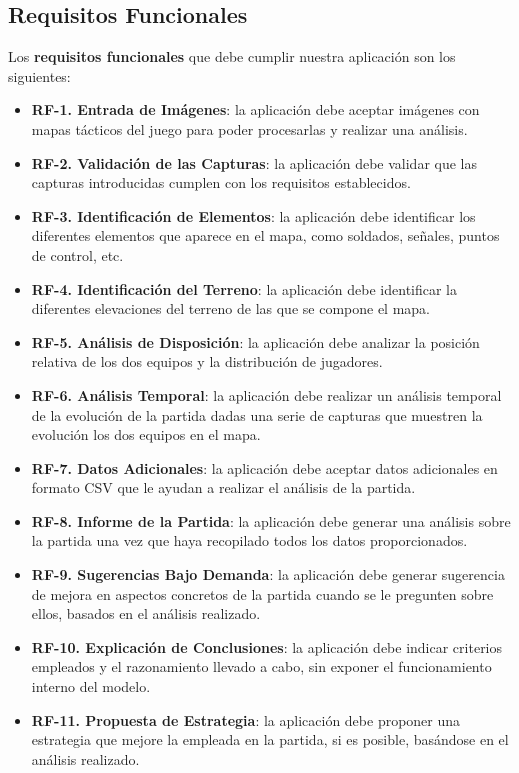 \subsection{Requisitos Funcionales}
Los \textbf{requisitos funcionales} que debe cumplir nuestra aplicación son los siguientes:
\begin{itemize}
	\item \textbf{RF-1. Entrada de Imágenes}: la aplicación debe aceptar imágenes con mapas tácticos del juego para poder procesarlas y realizar una análisis.
	\item \textbf{RF-2. Validación de las Capturas}: la aplicación debe validar que las capturas introducidas cumplen con los requisitos establecidos.
	\item \textbf{RF-3. Identificación de Elementos}: la aplicación debe identificar los diferentes elementos que aparece en el mapa, como soldados, señales, puntos de control, etc.
	\item \textbf{RF-4. Identificación del Terreno}: la aplicación debe identificar la diferentes elevaciones del terreno de las que se compone el mapa.
	\item \textbf{RF-5. Análisis de Disposición}: la aplicación debe analizar la posición relativa de los dos equipos y la distribución de jugadores.
	\item \textbf{RF-6. Análisis Temporal}: la aplicación debe realizar un análisis temporal de la evolución de la partida dadas una serie de capturas que muestren la evolución los dos equipos en el mapa.
	\item \textbf{RF-7. Datos Adicionales}: la aplicación debe aceptar datos adicionales en formato CSV que le ayudan a realizar el análisis de la partida.
	\item \textbf{RF-8. Informe de la Partida}: la aplicación debe generar una análisis sobre la partida una vez que haya recopilado todos los datos proporcionados.
	\item \textbf{RF-9. Sugerencias Bajo Demanda}: la aplicación debe generar sugerencia de mejora en aspectos concretos de la partida cuando se le pregunten sobre ellos, basados en el análisis realizado.
	\item \textbf{RF-10. Explicación de Conclusiones}: la aplicación debe indicar criterios empleados y el razonamiento llevado a cabo, sin exponer el funcionamiento interno del modelo.
	\item \textbf{RF-11. Propuesta de Estrategia}: la aplicación debe proponer una estrategia que mejore la empleada en la partida, si es posible, basándose en el análisis realizado.

\end{itemize}
